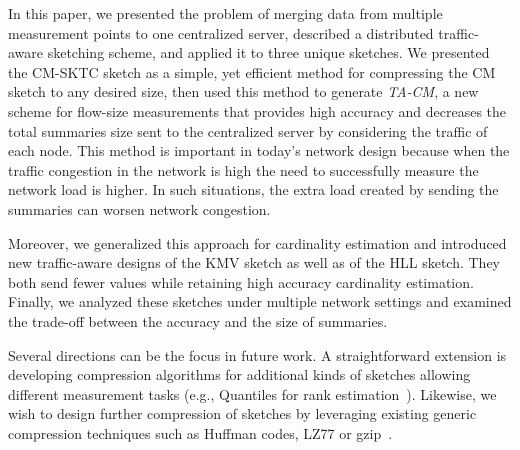 In this paper, we presented the problem of merging data from multiple measurement points to one centralized server, described a distributed traffic-aware sketching scheme, and applied it to three unique sketches. 
We presented the CM-SKTC sketch as a simple, yet efficient method for compressing the CM sketch to any desired size, then used this method to generate \emph{TA-CM}, a new scheme for flow-size measurements that 
provides high accuracy 
and  decreases the total summaries size sent to the centralized server by considering the traffic of each node. 
This method is important in today's network design because when the traffic congestion in the network is high the need to successfully measure the network load is higher. In such situations, the extra load created by sending the summaries can worsen network congestion. 

Moreover, we generalized this approach for cardinality estimation and introduced new traffic-aware designs of the KMV sketch as well as of the HLL sketch. They both send fewer values while retaining high accuracy cardinality estimation. 
Finally, we analyzed these sketches under multiple network settings and examined the trade-off between the accuracy and the size of summaries.

Several directions can be the focus in future work.  
A straightforward extension is developing compression algorithms for additional kinds of sketches %
allowing different measurement tasks (e.g., Quantiles for rank estimation~\cite{agarwal2013mergeable}).  
Likewise, we wish to design further compression of sketches 
by leveraging existing generic compression techniques such as Huffman codes, LZ77 or gzip~\cite{huffman1952method, ziv1977universal, deutsch1996gzip}. 